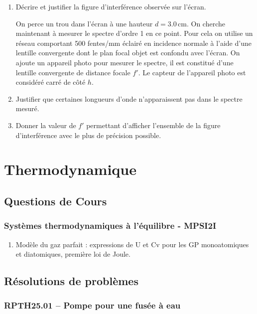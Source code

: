 \begin{enumerate}
\item Décrire et justifier la figure d'interférence observée sur l'écran.

On perce un trou dans l'écran à une hauteur $d = 3.0\,\text{cm}$. On cherche maintenant à mesurer le spectre d'ordre 1 en ce point. Pour cela on utilise un réseau comportant 500 fentes/mm éclairé en incidence normale à l'aide d'une lentille convergente dont le plan focal objet est confondu avec l'écran. On ajoute un appareil photo pour mesurer le spectre, il est constitué d'une lentille convergente de distance focale $f'$. Le capteur de l'appareil photo est considéré carré de côté $h$.

\item Justifier que certaines longueurs d'onde n'apparaissent pas dans le spectre mesuré.
\item Donner la valeur de $f'$ permettant d'afficher l'ensemble de la figure d'interférence avec le plus de précision possible.
\end{enumerate}

\newpage
\section*{Thermodynamique}

\subsection*{Questions de Cours}

\subsubsection*{Systèmes thermodynamiques à l'équilibre - MPSI2I}
\begin{enumerate}
\item Modèle du gaz parfait : expressions de U et Cv pour les GP monoatomiques et diatomiques, première loi de Joule.
\end{enumerate}



\subsection*{Résolutions de problèmes}

\subsubsection*{RPTH25.01 -- Pompe pour une fusée à eau }

